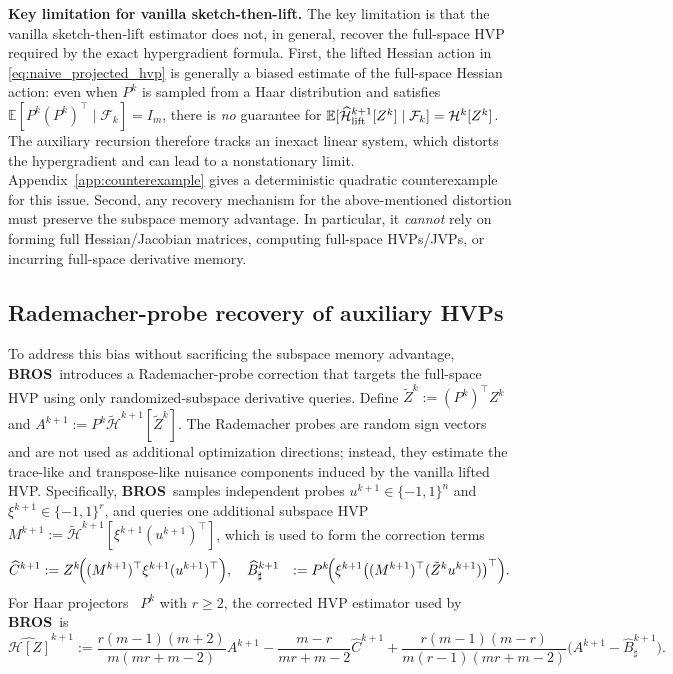 \documentclass{pkumelon}
\theoremstyle{plain}
\newcommand{\E}{\mathbb{E}}
\newcommand{\oursname}{\textnormal{\textbf{BROS}}}
\newcommand{\ours}{\oursname\ }
\begin{document}
\textbf{Key limitation for vanilla sketch-then-lift. }The key limitation is that the vanilla sketch-then-lift estimator does not, in general, recover the full-space HVP required by the exact hypergradient formula. First, the lifted Hessian action in \eqref{eq:naive_projected_hvp} is generally a biased estimate of the full-space Hessian action: even when $P^k$ is sampled from a Haar distribution and satisfies $\E[P^k(P^k)^\top\mid\mathcal F_k]=I_m$, there is \emph{no} guarantee for $\E[\widehat{\mathcal H}_{\rm lift}^{k+1}[Z^k]\mid\mathcal F_k]=\mathcal H^k[Z^k]$. The auxiliary recursion therefore tracks an inexact linear system, which distorts the hypergradient and can lead to a nonstationary limit. Appendix~\ref{app:counterexample} gives a deterministic quadratic counterexample for this issue. Second, any recovery mechanism for the above-mentioned distortion must preserve the subspace memory advantage. In particular, it \emph{cannot} rely on forming full Hessian/Jacobian matrices, computing full-space HVPs/JVPs, or incurring full-space derivative memory.

\subsection{Rademacher-probe recovery of auxiliary HVPs}
\label{subsec:correction_single}
To address this bias without sacrificing the subspace memory advantage, \ours introduces a Rademacher-probe correction that targets the full-space HVP using only randomized-subspace derivative queries. Define $\tilde Z^k:=(P^k)^\top Z^k$ and $A^{k+1}:=P^k\tilde{\mathcal H}^{k+1}[\tilde Z^k]$. The Rademacher probes are random sign vectors and are not used as additional optimization directions; instead, they estimate the trace-like and transpose-like nuisance components induced by the vanilla lifted HVP. Specifically, \ours samples independent probes $u^{k+1}\in\{-1,1\}^{n}$ and $\xi^{k+1}\in\{-1,1\}^{r}$, and queries one additional subspace HVP $M^{k+1}:=\tilde{\mathcal H}^{k+1}[\xi^{k+1}(u^{k+1})^\top]$, which is used to form the correction terms
\begin{equation}
\label{eq:single_biprobe_estimators}
\begin{aligned}
\widehat C^{k+1}&:=Z^k\!\Bigl((M^{k+1})^\top\xi^{k+1}(u^{k+1})^\top\Bigr), \quad \widehat B_{\sharp}^{k+1}&:=P^k\!\Bigl(\xi^{k+1}\bigl((M^{k+1})^\top(\tilde Z^ku^{k+1})\bigr)^\top\Bigr).
\end{aligned}
\end{equation}
For Haar projectors~\citep{chen2025memory} $P^k$ with $r\ge2$, the corrected HVP estimator used by \ours is
{\small
\begin{equation}
\label{eq:single_unbiased_estimator}
\widehat{\mathcal H[Z]}^{k+1}:=\frac{r(m-1)(m+2)}{m(mr+m-2)}A^{k+1}-\frac{m-r}{mr+m-2}\widehat C^{k+1}+\frac{r(m-1)(m-r)}{m(r-1)(mr+m-2)}\bigl(A^{k+1}-\widehat B_{\sharp}^{k+1}\bigr).
\end{equation}}
\end{document}
